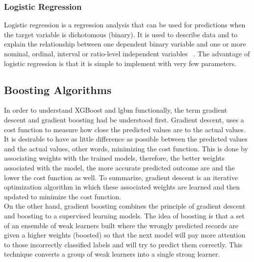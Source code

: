 \documentclass[journal,twoside,web]{ieeecolor}
\begin{document}
                        
\subsubsection{Logistic Regression}
Logistic regression is a regression analysis that can be used for predictions when the target variable is dichotomous (binary). It is used to describe data and to explain the relationship between one dependent binary variable and one or more nominal, ordinal, interval or ratio-level independent variables ~\cite{statisticssolutions}. The advantage of logistic regression is that it is simple to implement with very few parameters.

\subsection{Boosting Algorithms}
In order to understand XGBoost and lgbm functionally, the term gradient descent and gradient boosting had be understood first. 
Gradient descent, uses a cost function to measure how close the predicted values are to the actual values. It is desirable to have as little difference as possible between the predicted values and the actual values, other words, minimizing the cost function. This is done by associating weights with the trained models, therefore, the better weights associated with the model, the more accurate predicted outcome are and the lower the cost function as well. To summarize, gradient descent is an iterative optimization algorithm in which these associated weights are learned and then updated to minimize the cost function. \\
On the other hand, gradient boosting combines the principle of gradient descent and boosting to a supervised learning models. The idea of boosting is that a set of an ensemble of weak learners built where the wrongly predicted records are given a higher weights (boosted) so that the next model will pay more attention to those incorrectly classified labels and will try to predict them correctly. This technique converts a group of weak learners into a single strong learner.
\end{document}
